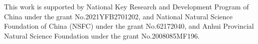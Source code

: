 \documentclass[manuscript,screen]{acmart}
\begin{document}
\begin{acks}
    This work is supported by National Key Research and Development Program of China under the grant No.2021YFB2701202, and National Natural Science Foundation of China (NSFC) under the grant No.62172040,  and Anhui Provincial Natural Science Foundation under the grant No.2008085MF196.
\end{acks}





\end{document}
